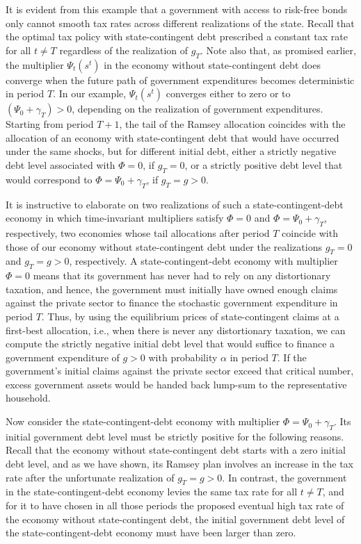 It is evident from this example that a government with access
to risk-free bonds only cannot smooth tax rates across  different
realizations of the state. Recall that the optimal tax policy with
state-contingent debt prescribed a constant tax rate for all
$t\not=T$ regardless of the realization of $g_T$. Note also that,
as promised earlier, the multiplier $\Psi_t(s^t)$ in the economy
without state-contingent debt does converge when the future path
of government expenditures becomes deterministic in period $T$. In
our example, $\Psi_t(s^t)$ converges  either to zero or to
$(\Psi_0+\gamma_T)>0$, depending on the realization of government
expenditures. Starting from period $T+1$, the  tail of the Ramsey
allocation coincides  with the allocation of an economy with
state-contingent debt that would have occurred under the same
shocks, but for different initial debt, either a strictly
negative debt level associated with $\Phi=0$, if $g_T=0$, or a
strictly positive debt level that would correspond to
$\Phi = \Psi_0+\gamma_T$, if $g_T=g>0$.

It is instructive to elaborate on two realizations of such a  state-contingent-debt
economy   in which  time-invariant multipliers satisfy  $\Phi=0$ and
$\Phi = \Psi_0+\gamma_T$, respectively, two economies whose tail allocations
after period $T$ coincide with those of our economy without
state-contingent debt under the realizations $g_T=0$ and $g_T=g>0$,
respectively. A state-contingent-debt economy with multiplier $\Phi=0$
means that its government has never had to rely on any
distortionary taxation, and hence, the government must initially
have owned enough claims against the private sector to finance
the stochastic government expenditure in period $T$. Thus, by using
the equilibrium prices of state-contingent claims at a first-best
allocation, i.e., when there is never any distortionary taxation,
we can compute the strictly negative initial debt level that would
suffice to finance a government expenditure of $g>0$ with
probability $\alpha$ in period $T$. If the government's initial
claims against the private sector exceed that critical number,
 excess government assets would be handed back lump-sum to
the representative household.

Now consider the state-contingent-debt economy with multiplier
$\Phi = \Psi_0+\gamma_T$. Its initial government debt level must
be strictly positive for the following reasons. Recall that the
economy without state-contingent debt starts with a zero initial
debt level, and as we have shown, its Ramsey plan involves an increase
in the tax rate after the unfortunate realization of $g_T=g>0$.
In contrast, the government in the state-contingent-debt economy
levies the same tax rate for all $t\not=T$, and for it to have
chosen in all those periods the proposed  eventual high tax rate of
the economy without state-contingent debt, the initial government
debt level of the state-contingent-debt economy must have been
larger than zero.

